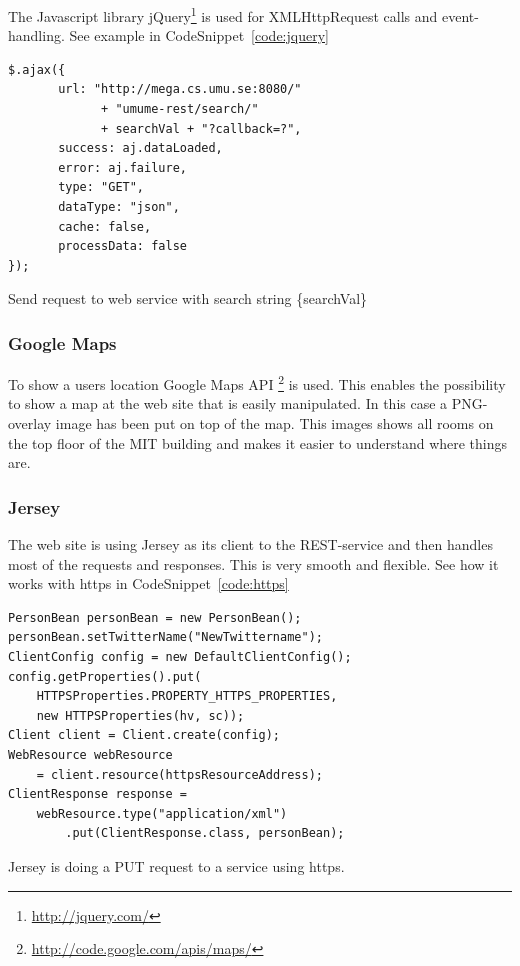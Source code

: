 \documentclass[titlepage, twocolumn, a4paper, 10pt]{article}
\begin{document}
The Javascript library jQuery\footnote{\url{http://jquery.com/}} is
used for XMLHttpRequest calls and event-handling. See example in
CodeSnippet~\ref{code:jquery}

\begin{code}
  \begin{footnotesize}
\begin{verbatim}
$.ajax({
       url: "http://mega.cs.umu.se:8080/"
             + "umume-rest/search/"
             + searchVal + "?callback=?",
       success: aj.dataLoaded,
       error: aj.failure,
       type: "GET",
       dataType: "json",
       cache: false,
       processData: false
});
\end{verbatim}
  \end{footnotesize}
  \caption{Send request to web service with search string \{searchVal\}}\label{code:jquery}
\end{code}

\subsubsection{Google Maps}\label{sec:googlemaps}
To show a users location Google Maps API
\footnote{\url{http://code.google.com/apis/maps/}} is used.
This enables the possibility to show a map at the web site that is
easily manipulated. In this case a PNG-overlay image has been
put on top of the map. This images shows all rooms on the top
floor of the MIT building and makes it easier to understand where
things are.

\subsubsection{Jersey}
The web site is using Jersey as its client to the REST-service and
then handles most of the requests and responses. This is very smooth
and flexible. See how it works with https in CodeSnippet~\ref{code:https}

\begin{code}
  \begin{footnotesize}
\begin{verbatim}
PersonBean personBean = new PersonBean();
personBean.setTwitterName("NewTwittername");
ClientConfig config = new DefaultClientConfig();
config.getProperties().put(
    HTTPSProperties.PROPERTY_HTTPS_PROPERTIES,
    new HTTPSProperties(hv, sc));
Client client = Client.create(config);
WebResource webResource
    = client.resource(httpsResourceAddress);
ClientResponse response =
    webResource.type("application/xml")
        .put(ClientResponse.class, personBean);
\end{verbatim}
  \end{footnotesize}
  \caption{Jersey is doing a PUT request to a service using https.}\label{code:https}
\end{code}
\end{document}
